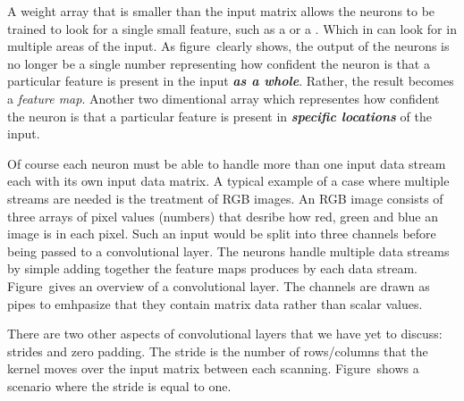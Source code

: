 A weight array that is smaller than the input matrix allows the neurons to be trained to look for a single small feature, such as a  or a .
Which in can look for in multiple areas of the input.
As figure~ clearly shows, the output of the neurons is no longer be a single number representing how  confident the neuron is that a particular feature is present in the input {\em\bf as a whole}.
Rather, the result becomes a {\em feature map}.
Another two dimentional array which representes how  confident the neuron is that a particular feature is present in {\em\bf specific locations} of the input.

\startplacefigure[
    reference=conv-operation,
    title={The basic forward operation of a convolutional layer~\cite[escontrela_2018].},
    location=bottom,
]
{}{}
{}{}
{}{}
{}{}
{}{}
{}{}
{}{}
{}{}
\stopcombination
\stopplacefigure

Of course each neuron must be able to handle more than one input data stream each with its own input data matrix.
A typical example of a case where multiple streams are needed is the treatment of RGB images.
An RGB image consists of three arrays of pixel values (numbers) that desribe how red, green and blue an image is in each pixel.
Such an input would be split into three channels before being passed to a convolutional layer.
The neurons handle multiple data streams by simple adding together the feature maps produces by each data stream.
Figure~\in[cv-network] gives an overview of a convolutional layer.
The channels are drawn as pipes to emhpasize that they contain matrix data rather than scalar values.

\startplacefigure[
    reference=cv-network,
    location=bottom,
    title={A diagram of a convolutional layer},
]
\stopplacefigure

\startsubsubsection[title=Strides and zero padding]
There are two other aspects of convolutional layers that we have yet to discuss: strides and zero padding.
The stride is the number of rows/columns that the kernel moves over the input matrix between each scanning.
Figure~ shows a scenario where the stride is equal to one.

